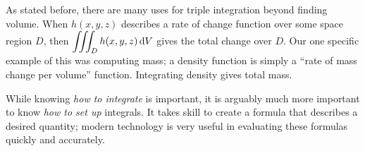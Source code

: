 As stated before, there are many uses for triple integration beyond finding volume. When $h(x,y,z)$ describes a rate of change function over some space region $D$, then $\displaystyle \iiint_D h(x,y,z)\operatorname{d}\! V$ gives the total change over $D$. Our one specific example of this was computing mass; a density function is simply a ``rate of mass change per volume'' function. Integrating density gives total mass.

While knowing \emph{how to integrate}  is important, it is arguably much more important to know \emph{how to set up} integrals. It takes skill to create a formula that describes a desired quantity; modern technology is very useful in evaluating these formulas quickly and accurately.


